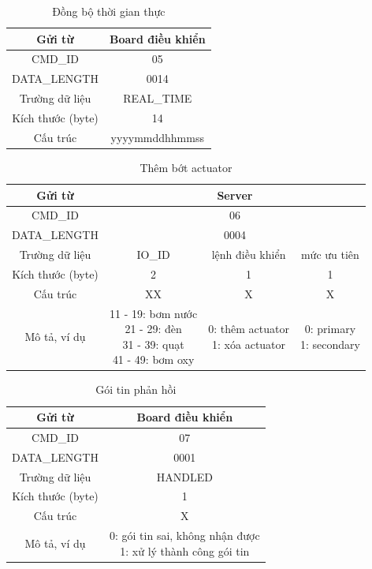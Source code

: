 \documentclass[a4paper,12pt,oneside]{article}
\begin{document}
\begin{table}[!htp]
\centering
\begin{tabular}{|c|c|}
\hline 
Gửi từ & Board điều khiển \\ 
\hline 
CMD\_ID & 05 \\ 
\hline 
DATA\_LENGTH & 0014 \\ 
\hline 
Trường dữ liệu & REAL\_TIME \\ 
\hline 
Kích thước (byte) & 14 \\ 
\hline 
Cấu trúc & yyyymmddhhmmss \\ 
\hline 
\end{tabular} 
\caption{Đồng bộ thời gian thực}
\end{table}

\begin{table}[!htp]
\centering
\begin{tabular}{|c|c|c|c|}
\hline 
Gửi từ & \multicolumn{3}{c|}{Server} \\ 
\hline 
CMD\_ID & \multicolumn{3}{c|}{06} \\ 
\hline 
DATA\_LENGTH & \multicolumn{3}{c|}{0004} \\ 
\hline 
Trường dữ liệu & IO\_ID & lệnh điều khiển & mức ưu tiên \\ 
\hline 
Kích thước (byte) & 2 & 1 & 1 \\ 
\hline 
Cấu trúc & XX & X & X \\ 
\hline 
Mô tả, ví dụ & \makecell{11 - 19: bơm nước \\ 21 - 29: đèn \\ 31 - 39: quạt \\ 41 - 49: bơm oxy} & \makecell{0: thêm actuator \\ 1: xóa actuator} & \makecell{0: primary \\ 1: secondary} \\ 
\hline 
\end{tabular} 
\caption{Thêm bớt actuator}
\end{table}

\begin{table}[!htp]
\centering
\begin{tabular}{|c|c|}
\hline 
Gửi từ & Board điều khiển \\ 
\hline 
CMD\_ID & 07 \\ 
\hline 
DATA\_LENGTH & 0001 \\ 
\hline 
Trường dữ liệu & HANDLED \\ 
\hline 
Kích thước (byte) & 1 \\ 
\hline 
Cấu trúc & X \\ 
\hline 
Mô tả, ví dụ & \makecell{0: gói tin sai, không nhận được \\ 1: xử lý thành công gói tin} \\ 
\hline 
\end{tabular} 
    \caption{Gói tin phản hồi}
\end{table}
\end{document}

